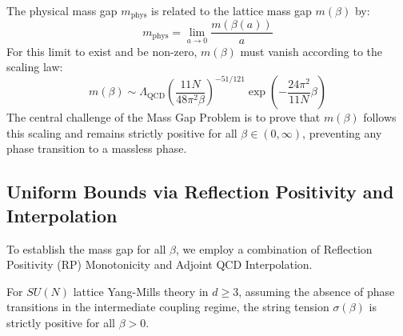 The physical mass gap $m_{\text{phys}}$ is related to the lattice mass gap $m(\beta)$ by:
\begin{equation}
    m_{\text{phys}} = \lim_{a \to 0} \frac{m(\beta(a))}{a}
\end{equation}
For this limit to exist and be non-zero, $m(\beta)$ must vanish according to the scaling law:
\begin{equation}
    m(\beta) \sim \Lambda_{\text{QCD}} \left( \frac{11N}{48\pi^2 \beta} \right)^{-51/121} \exp\left( -\frac{24\pi^2}{11N} \beta \right)
\end{equation}
The central challenge of the Mass Gap Problem is to prove that $m(\beta)$ follows this scaling and remains strictly positive for all $\beta \in (0, \infty)$, preventing any phase transition to a massless phase.

\subsection{Uniform Bounds via Reflection Positivity and Interpolation}

To establish the mass gap for all $\beta$, we employ a combination of Reflection Positivity (RP) Monotonicity and Adjoint QCD Interpolation.

\begin{theorem}
    For $SU(N)$ lattice Yang-Mills theory in $d \ge 3$, assuming the absence of phase transitions in the intermediate coupling regime, the string tension $\sigma(\beta)$ is strictly positive for all $\beta > 0$.
\end{theorem}

